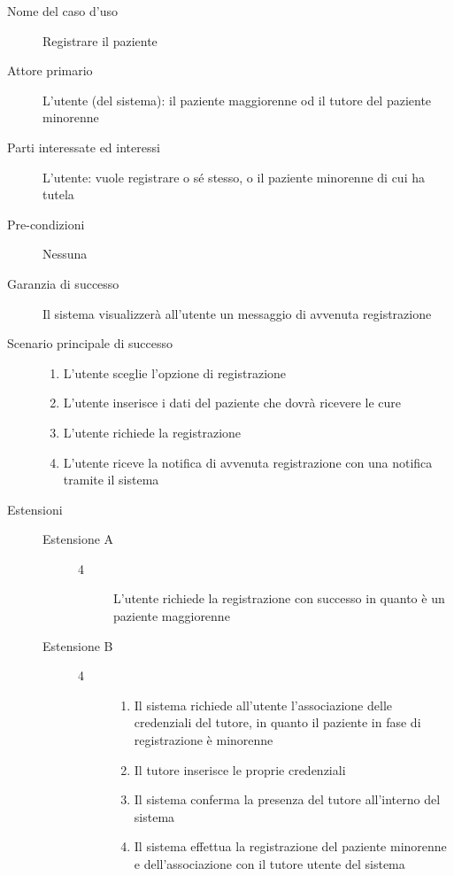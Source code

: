 \begin{description}
\item[Nome del caso d'uso] Registrare il paziente
\item[Attore primario]
	L'utente (del sistema): il paziente maggiorenne od il tutore del paziente minorenne

\item[Parti interessate ed interessi]
	L'utente: vuole registrare o sé stesso, o il paziente minorenne di cui ha tutela

\item[Pre-condizioni]
	Nessuna

\item[Garanzia di successo]
	Il sistema visualizzerà all'utente un messaggio di avvenuta registrazione

\item[Scenario principale di successo]

\begin{enumerate}
	\item L'utente sceglie l'opzione di registrazione
	\item L'utente inserisce i dati del paziente che dovrà ricevere le cure
	\item L'utente richiede la registrazione
	\item L'utente riceve la notifica di avvenuta registrazione con una notifica tramite il sistema
\end{enumerate}

\item[Estensioni]
\begin{description}
	\item[Estensione A]
	\medskip
	
	\begin{description}
	\item[4] L'utente richiede la registrazione con successo in quanto è un paziente maggiorenne
	\end{description}
\end{description}


\begin{description}
	\item[Estensione B]
	\medskip
	
	\begin{description}
	\item[4] 
	\begin{enumerate}
		\item Il sistema richiede all'utente l'associazione delle credenziali del tutore, in quanto il paziente in fase di registrazione è minorenne
		\item Il tutore inserisce le proprie credenziali
		\item Il sistema conferma la presenza del tutore all'interno del sistema 
		\item Il sistema effettua la registrazione del paziente minorenne e dell'associazione con il tutore utente del sistema
	\end{enumerate}
	\end{description}
\end{description}


\end{description}
